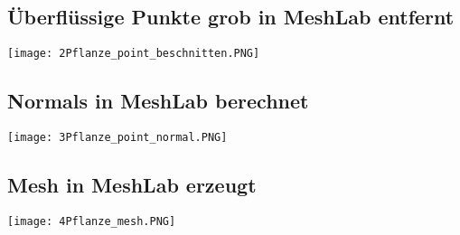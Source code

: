\documentclass{scrartcl}
\begin{document}
\subsection{Überflüssige Punkte grob in MeshLab entfernt}
\begin{center}
\texttt{[image: 2Pflanze\_point\_beschnitten.PNG]}
\end{center}
\subsection{Normals in MeshLab berechnet}
\begin{center}
\texttt{[image: 3Pflanze\_point\_normal.PNG]}
\end{center}
\subsection{Mesh in MeshLab erzeugt}
\begin{center}
\texttt{[image: 4Pflanze\_mesh.PNG]}
\end{center}
\end{document}
